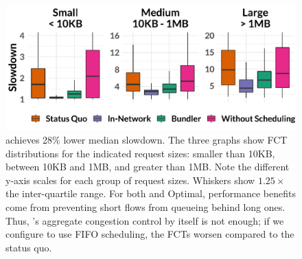 \begin{figure}
    \centering
\begin{knitrout}
\color{fgcolor}
\includegraphics[width=\maxwidth]{figure/eval:best-1} 

\end{knitrout}
    \caption{\name achieves 28\% lower median slowdown. 
The three graphs show FCT distributions for the indicated request sizes: smaller than 10KB, between 10KB and 1MB, and greater than 1MB.  Note the different y-axis scales for each group of request sizes. Whiskers show $1.25 \times$ the inter-quartile range. 
For both \name and Optimal, performance benefits come from preventing short flows from queueing behind long ones. 
Thus, \name's aggregate congestion control by itself is not enough; if we configure \name to use FIFO scheduling, the FCTs worsen compared to the status quo.
    }\label{fig:eval:best}
\end{figure}
\newcommand{\overviewBenefitsBaselineMedian}{1.76\xspace}
\newcommand{\overviewBenefitsBaselineTail}{79.37\xspace}
\newcommand{\overviewBenefitsBundlerMedian}{1.26\xspace}
\newcommand{\overviewBenefitsBundlerTail}{41.38\xspace}
\newcommand{\overviewBenefitsOptimalMedian}{1.07\xspace}
\newcommand{\overviewBenefitsOptimalTail}{27.49\xspace}
\newcommand{\overviewBenefitsBundlerMedianImprovement}{28\%\xspace}
